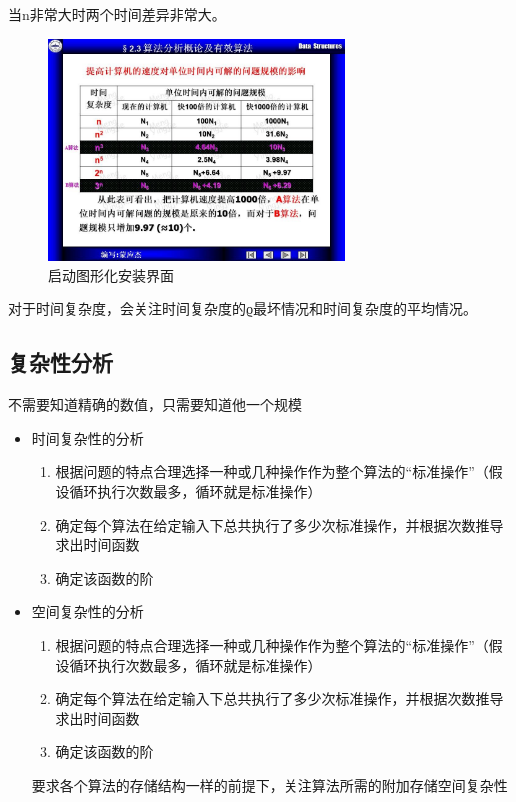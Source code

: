 \documentclass[AutoFakeBold]{LZUThesis2007}
\begin{document}
			当n非常大时两个时间差异非常大。

			\begin{figure}[H]
			    \centering
			    \includegraphics[width=0.7\textwidth]{figures/2.3.jpg}
			    \caption{启动图形化安装界面}
			    \label{fig_install_texlive}
			\end{figure}

			对于时间复杂度，会关注时间复杂度的ϱ最坏情况和时间复杂度的平均情况。

		\subsection{复杂性分析}

			不需要知道精确的数值，只需要知道他一个规模

			\begin{itemize}
				\item 时间复杂性的分析
					\begin{enumerate}
						\item 根据问题的特点合理选择一种或几种操作作为整个算法的“标准操作”（假设循环执行次数最多，循环就是标准操作）
						\item 确定每个算法在给定输入下总共执行了多少次标准操作，并根据次数推导求出时间函数
						\item 确定该函数的阶
					\end{enumerate}
				\item 空间复杂性的分析
					\begin{enumerate}
						\item 根据问题的特点合理选择一种或几种操作作为整个算法的“标准操作”（假设循环执行次数最多，循环就是标准操作）
						\item 确定每个算法在给定输入下总共执行了多少次标准操作，并根据次数推导求出时间函数
						\item 确定该函数的阶
					\end{enumerate}
				
					要求各个算法的存储结构一样的前提下，关注算法所需的附加存储空间复杂性

			\end{itemize}
\end{document}

